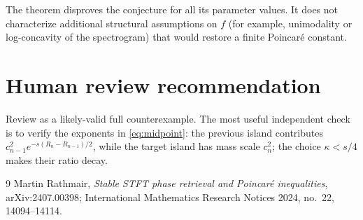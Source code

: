 \documentclass[11pt]{article}
\begin{document}
The theorem disproves the conjecture for all its parameter values.  It does
not characterize additional structural assumptions on \(f\) (for example,
unimodality or log-concavity of the spectrogram) that would restore a finite
Poincar\'e constant.

\section*{Human review recommendation}

Review as a likely-valid full counterexample.  The most useful independent
check is to verify the exponents in \eqref{eq:midpoint}: the previous island
contributes \(c_{n-1}^2e^{-s(R_n-R_{n-1})/2}\), while the target island has
mass scale \(c_n^2\); the choice \(\kappa<s/4\) makes their ratio decay.

\begin{thebibliography}{9}
Martin Rathmair,
\emph{Stable STFT phase retrieval and Poincar\'e inequalities},
arXiv:2407.00398; International Mathematics Research Notices 2024,
no.~22, 14094--14114.
\end{thebibliography}
\end{document}

